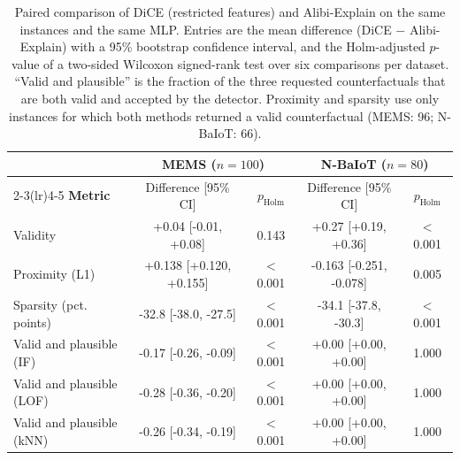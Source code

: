 \begin{table}[t]
\centering
\caption{Paired comparison of DiCE (restricted features) and Alibi-Explain on the same instances and the same MLP. Entries are the mean difference (DiCE $-$ Alibi-Explain) with a 95\% bootstrap confidence interval, and the Holm-adjusted $p$-value of a two-sided Wilcoxon signed-rank test over six comparisons per dataset. ``Valid and plausible'' is the fraction of the three requested counterfactuals that are both valid and accepted by the detector. Proximity and sparsity use only instances for which both methods returned a valid counterfactual (MEMS: 96; N-BaIoT: 66).}
\label{tab:ext-tests}
\scriptsize
\setlength{\tabcolsep}{4pt}
\begin{tabular}{@{}l cc cc@{}}
\toprule
 & \multicolumn{2}{c}{\textbf{MEMS} ($n=100$)} & \multicolumn{2}{c}{\textbf{N-BaIoT} ($n=80$)} \\
\cmidrule(lr){2-3}\cmidrule(lr){4-5}
\textbf{Metric} & Difference [95\% CI] & $p_{\mathrm{Holm}}$ & Difference [95\% CI] & $p_{\mathrm{Holm}}$ \\
\midrule
Validity & +0.04 [-0.01, +0.08] & 0.143 & +0.27 [+0.19, +0.36] & $<$0.001 \\
Proximity (L1) & +0.138 [+0.120, +0.155] & $<$0.001 & -0.163 [-0.251, -0.078] & 0.005 \\
Sparsity (pct. points) & -32.8 [-38.0, -27.5] & $<$0.001 & -34.1 [-37.8, -30.3] & $<$0.001 \\
Valid and plausible (IF) & -0.17 [-0.26, -0.09] & $<$0.001 & +0.00 [+0.00, +0.00] & 1.000 \\
Valid and plausible (LOF) & -0.28 [-0.36, -0.20] & $<$0.001 & +0.00 [+0.00, +0.00] & 1.000 \\
Valid and plausible (kNN) & -0.26 [-0.34, -0.19] & $<$0.001 & +0.00 [+0.00, +0.00] & 1.000 \\
\bottomrule
\end{tabular}
\end{table}
